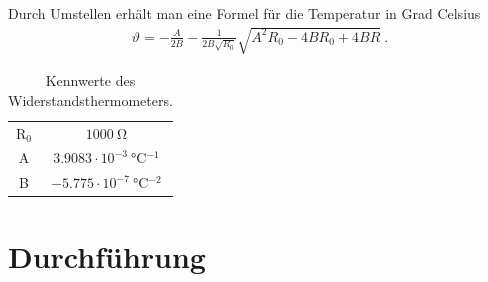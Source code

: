 \documentclass[12pt,a4paper,titlepage,headinclude,bibtotoc]{scrartcl}
\numberwithin{equation}{subsection}
\begin{document}
Durch Umstellen erhält man eine Formel für die Temperatur in Grad Celsius
\begin{align}
 \vartheta = -\frac{A}{2 B} - \frac{1}{2 B \sqrt{R_0}} \sqrt{A^2 R_0  - 4 B R_0 + 4 B R    }\label{eq:temperapt1000}~.
\end{align}

\begin{table}[!htb]
	\centering
	\begin{tabular}{|c|c|}
		\hline
		R$_0$ & $1000 ~ \si{\ohm}$\\
		A   & $3.9083 \cdot 10^{-3} ~ \si{\celsius^{-1}}$\\
		B   & $-5.775 \cdot 10^{-7} ~ \si{\celsius^{-2}}$\\
		\hline
	\end{tabular}
	\caption{Kennwerte des Widerstandsthermometers.}
	\label{tab:Pt1000}
\end{table}
\section{Durchführung}
\label{sec:durchfuehrung}
\end{document}
